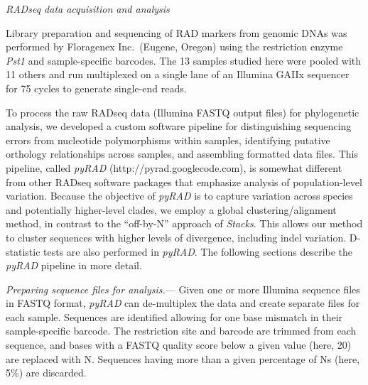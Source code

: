 \documentclass[12pt,letterpaper]{article}
\renewcommand{\subsection}[1]{%
\bigskip
\begin{center}
\begin{large}
\normalfont\itshape #1
\end{large}
\end{center}}
\renewcommand{\subsubsection}[1]{%
\vspace{2ex}
\noindent
\textit{#1.}---}
\begin{document}
\subsection{RADseq data acquisition and analysis}
Library preparation and sequencing of RAD markers from genomic DNAs
was performed by Floragenex Inc.\ (Eugene, Oregon) using the
restriction enzyme \emph{Pst1} and sample-specific barcodes. The 13
samples studied here were pooled with 11 others and run multiplexed on
a single lane of an Illumina GAIIx sequencer for 75 cycles to 
generate single-end reads.

To process the raw RADseq data (Illumina FASTQ output files) for
phylogenetic analysis, we developed a custom software pipeline for
distinguishing sequencing errors from nucleotide polymorphisms within
samples, identifying putative orthology relationships across samples,
and assembling formatted data files. This pipeline, called
\emph{pyRAD} (http://pyrad.googlecode.com), is somewhat different from
other RADseq software packages \citep[e.g.,
\emph{Stacks};][]{catchen_stacks:_2011} that emphasize analysis of
population-level variation. Because the objective of \emph{pyRAD} is
to capture variation across species and potentially higher-level
clades, we employ a global clustering/alignment method, in contrast to
the ``off-by-N'' approach of \emph{Stacks}. This allows our method to
cluster sequences with higher levels of divergence, including indel
variation. D-statistic tests are also performed in \emph{pyRAD}.
The following sections describe the \emph{pyRAD} pipeline in more
detail.

\subsubsection{Preparing sequence files for analysis}
Given one or more Illumina sequence files in FASTQ format,
\emph{pyRAD} can de-multiplex the data and create separate files for
each sample. Sequences are identified allowing for one base mismatch
in their sample-specific barcode. The restriction site and barcode are
trimmed from each sequence, and bases with a FASTQ quality score below
a given value (here, 20) are replaced with N. Sequences having more
than a given percentage of Ns (here, 5\%) are discarded.
\end{document}
